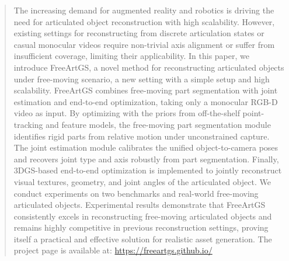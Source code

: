 \begin{abstract}
The increasing demand for augmented reality and robotics is driving the need for articulated object reconstruction with high scalability. 
However, existing settings for reconstructing from discrete articulation states or casual monocular videos require non-trivial axis alignment or suffer from insufficient coverage, limiting their applicability. 
In this paper, we introduce FreeArtGS, a novel method for reconstructing articulated objects under free-moving scenario, a new setting with a simple setup and high scalability. 
FreeArtGS combines free-moving part segmentation with joint estimation and end-to-end optimization, taking only a monocular RGB-D video as input. 
By optimizing with the priors from off-the-shelf point-tracking and feature models, the free-moving part segmentation module identifies rigid parts from relative motion under unconstrained capture. The joint estimation module calibrates the unified object-to-camera poses and recovers joint type and axis robustly from part segmentation. Finally, 3DGS-based end-to-end optimization is implemented to jointly reconstruct visual textures, geometry, and joint angles of the articulated object. We conduct experiments on two benchmarks and real-world free-moving articulated objects. Experimental results demonstrate that FreeArtGS consistently excels in reconstructing free-moving articulated objects and remains highly competitive in previous reconstruction settings, proving itself a practical and effective solution for realistic asset generation. The project page is available at: \url{https://freeartgs.github.io/}
\end{abstract}